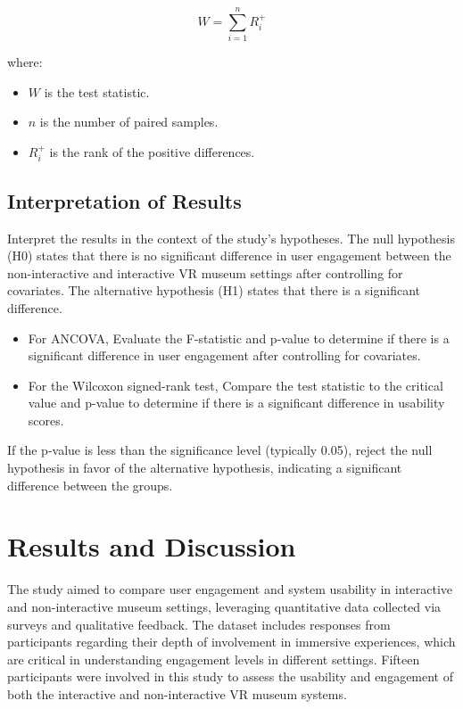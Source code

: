 \documentclass[conference]{IEEEtran}
\begin{document}
\[
W = \sum_{i=1}^n R_i^+
\]

where:
\begin{itemize}
    \item \( W \) is the test statistic.
    \item \( n \) is the number of paired samples.
    \item \( R_i^+ \) is the rank of the positive differences.
\end{itemize}

\subsection{Interpretation of Results} 
Interpret the results in the context of the study's hypotheses. The null hypothesis (H0) states that there is no significant difference in user engagement between the non-interactive and interactive VR museum settings after controlling for covariates. The alternative hypothesis (H1) states that there is a significant difference.

\begin{itemize}
    \item For ANCOVA, Evaluate the F-statistic and p-value to determine if there is a significant difference in user engagement after controlling for covariates.
\item For the Wilcoxon signed-rank test, Compare the test statistic to the critical value and p-value to determine if there is a significant difference in usability scores.
\end{itemize}
If the p-value is less than the significance level (typically 0.05), reject the null hypothesis in favor of the alternative hypothesis, indicating a significant difference between the groups.


\section{Results and Discussion}

The study aimed to compare user engagement and system usability in interactive and non-interactive museum settings, leveraging quantitative data collected via surveys and qualitative feedback. The dataset includes responses from participants regarding their depth of involvement in immersive experiences, which are critical in understanding engagement levels in different settings. Fifteen participants were involved in this study to assess the usability and engagement of both the interactive and non-interactive VR museum systems.
\end{document}
